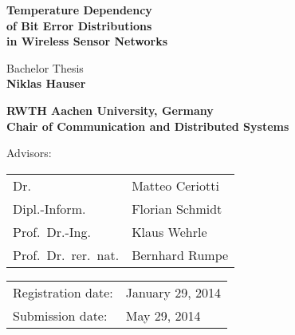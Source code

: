 \titlehead{
	\centering
	\texttt{[image: thesis-tex/logos/comsys-text]}
	\hfill
	\texttt{[image: thesis-tex/logos/rwth]}
} %

\begin{titlepage}

\let\footnotesize\small \let\footnoterule\relax

\hbox{}
\vfill

\centering

\begin{doublespace} 
{ \huge\textbf{\textsf{Temperature Dependency \\ \vspace{-0.4em}
of Bit Error Distributions \\ \vspace{-0.4em}
in Wireless Sensor Networks \\ \vspace{-0.4em}}}}
\end{doublespace}
\vskip 2cm

{\large Bachelor Thesis\\[5pt]}
{\large \textbf{Niklas Hauser}}
\vskip 1cm

\textbf{RWTH Aachen University, Germany\\[5pt]
        Chair of Communication and Distributed Systems}
\vskip 2cm

\large

Advisors:
\vskip 2mm

\begin{tabular}{R{7cm}p{7cm}}
Dr. & Matteo Ceriotti\\
Dipl.-Inform. & Florian Schmidt\\
Prof.~Dr.-Ing. & Klaus Wehrle\\
Prof.~Dr.~rer.~nat. & Bernhard Rumpe
\end{tabular}
\vskip 1cm

\begin{tabular}{R{6cm}p{6cm}}
Registration date:  & January 29, 2014 \\
Submission date:    & May 29, 2014 \\
\end{tabular}

\vfill

\end{titlepage}

